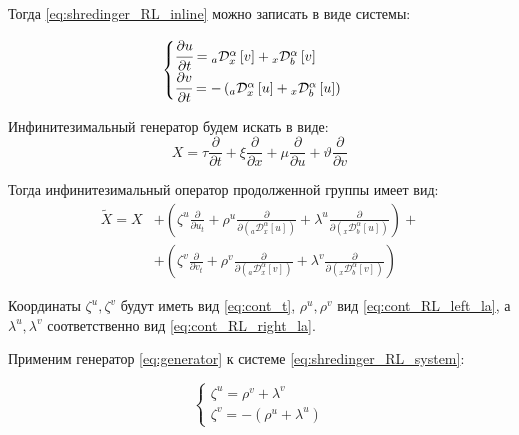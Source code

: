 \documentclass[a4paper, fontsize=14pt]{article}
\newcommand{\RLD}[3]{{}_{#1}\mathcal{D}_{#2}^{\alpha} \left[#3\right]} %
\begin{document}
Тогда \eqref{eq:shredinger_RL_inline} можно записать в виде системы:

\begin{equation}
  \label{eq:shredinger_RL_system}
  \begin{cases}
    \cfrac{\partial u}{\partial t} = \RLD{a}{x}{v} + \RLD{x}{b}{v} \\
    \cfrac{\partial v}{\partial t} = - \left( \RLD{a}{x}{u} + \RLD{x}{b}{u} \right)
  \end{cases}
\end{equation}


Инфинитезимальный генератор будем искать в виде:
\begin{equation*}
  X = \tau \frac{\partial}{\partial t}  + \xi \frac{\partial}{\partial x}  + \mu \frac{\partial}{\partial u}  + \vartheta  \frac{\partial}{\partial v}
\end{equation*}

Тогда инфинитезимальный оператор продолженной группы имеет вид:
\begin{equation}
  \label{eq:generator}
  \begin{split}
    \tilde{X} = X &+ \left(\zeta^u \frac{\partial }{\partial u_t} + \rho^u \frac{\partial }{\partial (\RLD{a}{x}{u})} + \lambda^u \frac{\partial }{\partial (\RLD{x}{b}{u})} \right) +\\
    &+\left(\zeta^v \frac{\partial }{\partial v_t}  + \rho^v \frac{\partial }{\partial (\RLD{a}{x}{v})}  + \lambda^v \frac{\partial }{\partial (\RLD{x}{b}{v})} \right)
  \end{split}
\end{equation}

Координаты $\zeta^u, \zeta^v$ будут иметь вид \eqref{eq:cont_t}, $\rho^u, \rho^v$ вид \eqref{eq:cont_RL_left_la}, а $\lambda^u, \lambda^v$ соответственно вид \eqref{eq:cont_RL_right_la}.

Применим генератор \eqref{eq:generator} к системе \eqref{eq:shredinger_RL_system}:

\begin{equation}
  \begin{cases}
    \zeta^u = \rho^v + \lambda^v \\ 
    \zeta^v = - (\rho^u + \lambda^u)
  \end{cases}
\end{equation}
\end{document}
